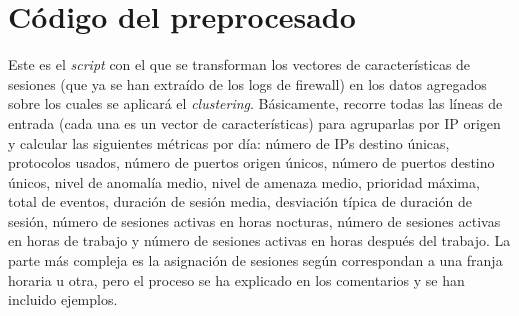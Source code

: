 \chapter{Código del preprocesado}\label{app:preprocesado}

Este es el \emph{script} con el que se transforman los vectores de características de sesiones (que ya se han extraído de los logs de firewall) en los datos agregados sobre los cuales se aplicará el \emph{clustering}.
Básicamente, recorre todas las líneas de entrada (cada una es un vector de características) para agruparlas por IP origen y calcular las siguientes métricas por día: número de IPs destino únicas, protocolos usados, número de puertos origen únicos, número de puertos destino únicos, nivel de anomalía medio, nivel de amenaza medio, prioridad máxima, total de eventos, duración de sesión media, desviación típica de duración de sesión, número de sesiones activas en horas nocturas, número de sesiones activas en horas de trabajo y número de sesiones activas en horas después del trabajo.
La parte más compleja es la asignación de sesiones según correspondan a una franja horaria u otra, pero el proceso se ha explicado en los comentarios y se han incluido ejemplos.


